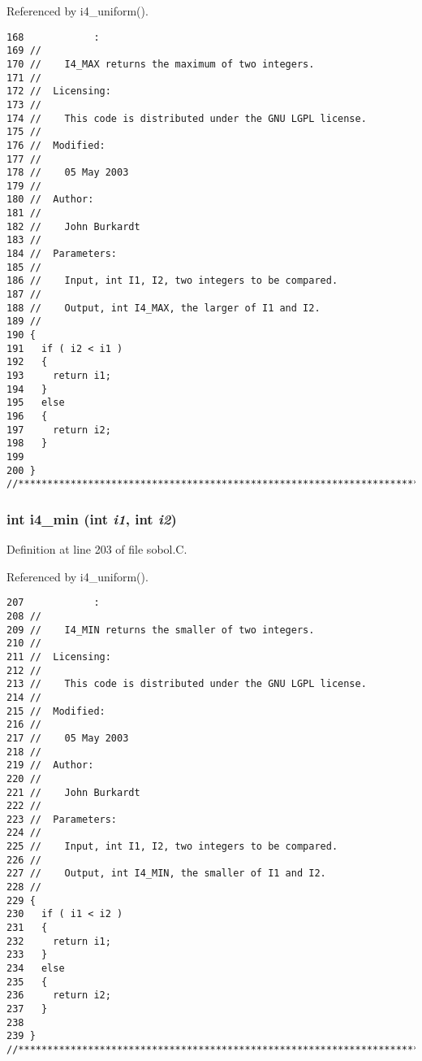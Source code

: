 Referenced by i4\_\-uniform().

\begin{Code}\begin{verbatim}168            :
169 //
170 //    I4_MAX returns the maximum of two integers.
171 //
172 //  Licensing:
173 //
174 //    This code is distributed under the GNU LGPL license. 
175 //
176 //  Modified:
177 //
178 //    05 May 2003
179 //
180 //  Author:
181 //
182 //    John Burkardt
183 //
184 //  Parameters:
185 //
186 //    Input, int I1, I2, two integers to be compared.
187 //
188 //    Output, int I4_MAX, the larger of I1 and I2.
189 //
190 {
191   if ( i2 < i1 ) 
192   {
193     return i1;
194   }
195   else 
196   {
197     return i2;
198   }
199 
200 }
//****************************************************************************80
\end{verbatim}
\end{Code}


\subsubsection{\setlength{\rightskip}{0pt plus 5cm}int i4\_\-min (int {\em i1}, int {\em i2})}\label{sobol_8C_e73c30e1658d722ce9ff2e671db331ca}




Definition at line 203 of file sobol.C.

Referenced by i4\_\-uniform().

\begin{Code}\begin{verbatim}207            :
208 //
209 //    I4_MIN returns the smaller of two integers.
210 //
211 //  Licensing:
212 //
213 //    This code is distributed under the GNU LGPL license. 
214 //
215 //  Modified:
216 //
217 //    05 May 2003
218 //
219 //  Author:
220 //
221 //    John Burkardt
222 //
223 //  Parameters:
224 //
225 //    Input, int I1, I2, two integers to be compared.
226 //
227 //    Output, int I4_MIN, the smaller of I1 and I2.
228 //
229 {
230   if ( i1 < i2 ) 
231   {
232     return i1;
233   }
234   else 
235   {
236     return i2;
237   }
238 
239 }
//****************************************************************************80
\end{verbatim}
\end{Code}


